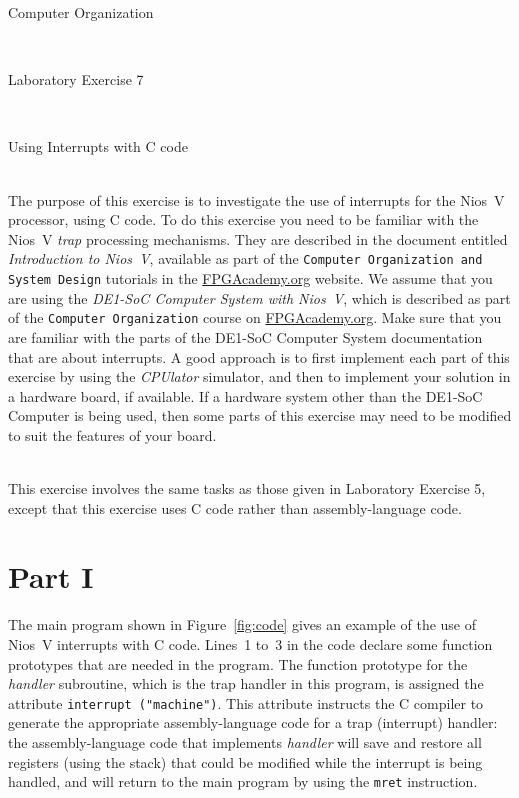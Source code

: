 \documentclass[epsfig,10pt,fullpage]{article}
\newcommand{\LabNum}{7}
\begin{document}
\centerline{\huge Computer Organization}
~\\
\centerline{\huge Laboratory Exercise \LabNum}
~\\
\centerline{\large Using Interrupts with C code}
~\\

The purpose of this exercise is to investigate the use of interrupts for the 
Nios\textsuperscript{\textregistered}~V processor, using C code. To do 
this exercise you need to be familiar with the Nios~V {\it trap} processing mechanisms.
They are described in the document entitled {\it Introduction to Nios~V}, 
available as part of the \texttt{Computer Organization and System Design} tutorials in the 
{\href{https://www.fpgacademy.org/tutorials.html} {FPGAcademy.org}} website.
We assume that you are using the {\it DE1-SoC Computer System with Nios~V},
which is described as part of the \texttt{Computer Organization} course on
{\href{https://www.fpgacademy.org/courses.html} {FPGAcademy.org}}. Make sure that you are
familiar with the parts of the DE1-SoC Computer System documentation that are about
interrupts.  A good approach is to first implement each part of this exercise by 
using the {\it CPUlator} simulator, and then to implement your solution in a hardware board,
if available.  If a hardware system other than the DE1-SoC Computer is being used, then 
some parts of this exercise may need to be modified to suit the features of your board. 

~\\
This exercise involves the same tasks as those given in Laboratory Exercise 5,
except that this exercise uses C code rather than assembly-language code.

\section*{Part I}

The main program shown in Figure~\ref{fig:code} gives an example of the use of Nios~V interrupts
with C code.  Lines~1 to~3 in the code declare some function prototypes that are needed in 
the program. The function prototype for the {\it handler} subroutine, which is the trap 
handler in this program, is assigned the attribute \texttt{interrupt ("machine")}. This 
attribute instructs the C compiler to generate the appropriate assembly-language code for 
a trap (interrupt) handler: the assembly-language code that implements {\it handler} will save
and restore all registers (using the stack) that could be modified while the interrupt is 
being handled, and will return to the main program by using the \texttt{mret} instruction.
\end{document}
